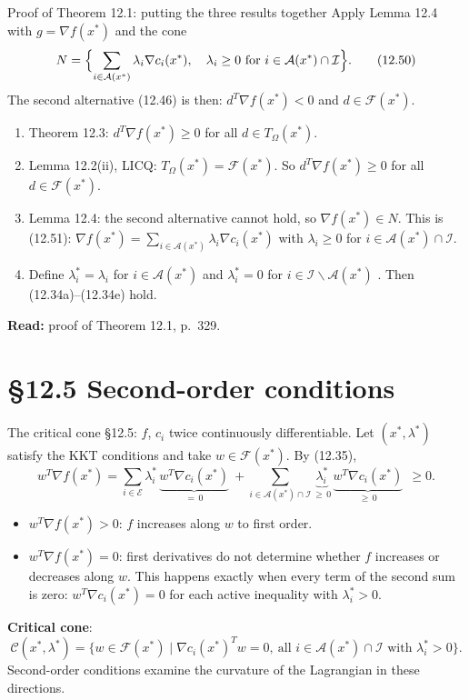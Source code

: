\documentclass[aspectratio=169,12pt]{beamer}
\newcommand{\xs}{x^{*}}
\newcommand{\gradf}{\nabla f}
\newcommand{\eqn}[1]{\text{\small(#1)}}
\newcommand{\readbook}[1]{{\color{red}\textbf{Read:} #1}}
\newcommand{\ls}{\lambda^{*}}
\newcommand{\cA}{\mathcal{A}}
\newcommand{\cC}{\mathcal{C}}
\newcommand{\cE}{\mathcal{E}}
\newcommand{\cF}{\mathcal{F}}
\newcommand{\cI}{\mathcal{I}}
\newcommand{\TO}{T_{\Omega}}
\begin{document}
\begin{frame}{Proof of Theorem 12.1: putting the three results together}
  Apply Lemma 12.4 with $g=\gradf(\xs)$ and the cone
  \[ N=\Bigl\{\sum_{i\in\cA(\xs)}\lambda_{i}\nabla c_{i}(\xs),\quad
      \lambda_{i}\ge 0\ \text{for } i\in\cA(\xs)\cap\cI\Bigr\} . \tag{12.50} \]
  The second alternative (12.46) is then: $d^{T}\gradf(\xs)<0$ and $d\in\cF(\xs)$.
  \begin{enumerate}\setlength\itemsep{0.1em}
    \item Theorem 12.3: $d^{T}\gradf(\xs)\ge 0$ for all $d\in\TO(\xs)$.
    \item Lemma 12.2(ii), \alert{LICQ}: $\TO(\xs)=\cF(\xs)$. So $d^{T}\gradf(\xs)\ge 0$ for all $d\in\cF(\xs)$.
    \item Lemma 12.4: the second alternative cannot hold, so $\gradf(\xs)\in N$. This is (12.51):
      $\gradf(\xs)=\sum_{i\in\cA(\xs)}\lambda_{i}\nabla c_{i}(\xs)$ with
      $\lambda_{i}\ge 0$ for $i\in\cA(\xs)\cap\cI$.
    \item Define $\ls_{i}=\lambda_{i}$ for $i\in\cA(\xs)$ and $\ls_{i}=0$ for $i\in\cI\backslash\cA(\xs)$
      \eqn{12.52}. Then (12.34a)--(12.34e) hold.
  \end{enumerate}
  \readbook{proof of Theorem 12.1, p.~329.}
\end{frame}

\section{\S12.5 Second-order conditions}

\begin{frame}{The critical cone}
  \S12.5: $f$, $c_{i}$ twice continuously differentiable. Let $(\xs,\ls)$ satisfy the KKT
  conditions and take $w\in\cF(\xs)$. By (12.35),
  \[ w^{T}\gradf(\xs)=\sum_{i\in\cE}\ls_{i}\,\underbrace{w^{T}\nabla c_{i}(\xs)}_{=\,0}
     \ +\sum_{i\in\cA(\xs)\cap\cI}\underbrace{\ls_{i}}_{\ge\,0}\,\underbrace{w^{T}\nabla c_{i}(\xs)}_{\ge\,0}\ \ \ge 0 . \]
  \begin{itemize}\setlength\itemsep{0.4em}
    \item $w^{T}\gradf(\xs)>0$: $f$ increases along $w$ to first order.
    \item $w^{T}\gradf(\xs)=0$: first derivatives do not determine whether $f$ increases or decreases
      along $w$. This happens exactly when every term of the second sum is zero:
      $w^{T}\nabla c_{i}(\xs)=0$ for each active inequality with $\ls_{i}>0$.
  \end{itemize}
  \textbf{Critical cone}:
  \[ \cC(\xs,\ls)=\{w\in\cF(\xs)\mid\nabla c_{i}(\xs)^{T}w=0,\ \text{all } i\in\cA(\xs)\cap\cI \text{ with } \ls_{i}>0\} . \]
  Second-order conditions examine the curvature of the Lagrangian in these directions.
\end{frame}
\end{document}

